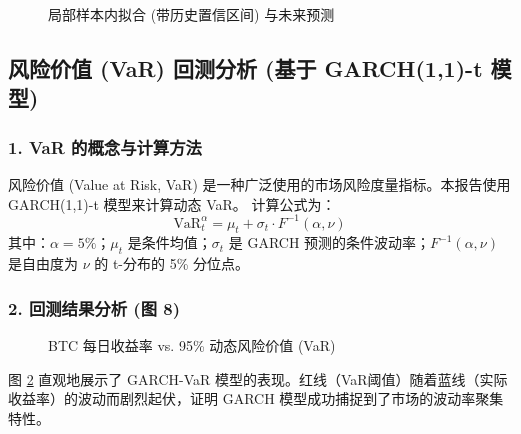 \documentclass[a4paper]{ctexart}
\begin{document}
	\begin{figure}[htbp]
		\centering
		\caption{局部样本内拟合 (带历史置信区间) 与未来预测}
		\label{fig:forecast_zoom}
	\end{figure}
	
	\subsection{风险价值 (VaR) 回测分析 (基于 GARCH(1,1)-t 模型)}
	\subsubsection{1. VaR 的概念与计算方法}
	风险价值 (Value at Risk, VaR) 是一种广泛使用的市场风险度量指标。本报告使用 GARCH(1,1)-t 模型来计算动态 VaR。
	计算公式为：
	$$ \text{VaR}_t^\alpha = \mu_t + \sigma_t \cdot F^{-1}(\alpha, \nu) $$
	其中：$\alpha = 5\%$；$\mu_t$ 是条件均值；$\sigma_t$ 是 GARCH 预测的条件波动率；$F^{-1}(\alpha, \nu)$ 是自由度为 $\nu$ 的 t-分布的 5\% 分位点。
	
	\subsubsection{2. 回测结果分析 (图 8)}
	\begin{figure}[htbp]
		\centering
		\caption{BTC 每日收益率 vs. 95\% 动态风险价值 (VaR)}
		\label{fig:var_backtest}
	\end{figure}
	图 \ref{fig:var_backtest} 直观地展示了 GARCH-VaR 模型的表现。红线（VaR阈值）随着蓝线（实际收益率）的波动而剧烈起伏，证明 GARCH 模型成功捕捉到了市场的波动率聚集特性。
	
\end{document}
